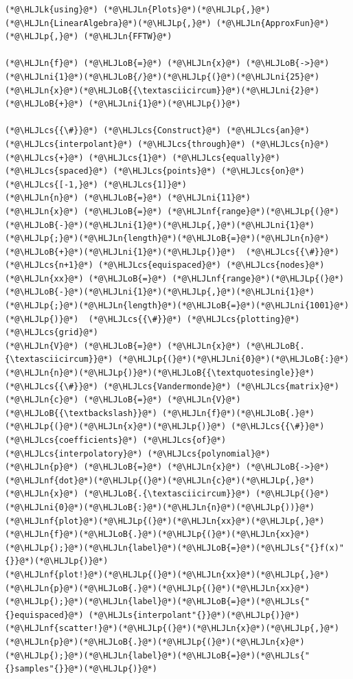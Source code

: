 \documentclass[12pt,a4paper]{article}
\newcommand{\HLJLk}[1]{\textcolor[RGB]{148,91,176}{\textbf{#1}}}
\newcommand{\HLJLn}[1]{#1}
\newcommand{\HLJLnf}[1]{\textcolor[RGB]{66,102,213}{#1}}
\newcommand{\HLJLs}[1]{\textcolor[RGB]{201,61,57}{#1}}
\newcommand{\HLJLni}[1]{\textcolor[RGB]{59,151,46}{#1}}
\newcommand{\HLJLoB}[1]{\textcolor[RGB]{102,102,102}{\textbf{#1}}}
\newcommand{\HLJLp}[1]{#1}
\newcommand{\HLJLcs}[1]{\textcolor[RGB]{153,153,119}{\textit{#1}}}
\begin{document}
\begin{lstlisting}
(*@\HLJLk{using}@*) (*@\HLJLn{Plots}@*)(*@\HLJLp{,}@*) (*@\HLJLn{LinearAlgebra}@*)(*@\HLJLp{,}@*) (*@\HLJLn{ApproxFun}@*)(*@\HLJLp{,}@*) (*@\HLJLn{FFTW}@*)

(*@\HLJLn{f}@*) (*@\HLJLoB{=}@*) (*@\HLJLn{x}@*) (*@\HLJLoB{->}@*) (*@\HLJLni{1}@*)(*@\HLJLoB{/}@*)(*@\HLJLp{(}@*)(*@\HLJLni{25}@*)(*@\HLJLn{x}@*)(*@\HLJLoB{{\textasciicircum}}@*)(*@\HLJLni{2}@*) (*@\HLJLoB{+}@*) (*@\HLJLni{1}@*)(*@\HLJLp{)}@*)

(*@\HLJLcs{{\#}}@*) (*@\HLJLcs{Construct}@*) (*@\HLJLcs{an}@*) (*@\HLJLcs{interpolant}@*) (*@\HLJLcs{through}@*) (*@\HLJLcs{n}@*) (*@\HLJLcs{+}@*) (*@\HLJLcs{1}@*) (*@\HLJLcs{equally}@*) (*@\HLJLcs{spaced}@*) (*@\HLJLcs{points}@*) (*@\HLJLcs{on}@*) (*@\HLJLcs{[-1,}@*) (*@\HLJLcs{1]}@*)
(*@\HLJLn{n}@*) (*@\HLJLoB{=}@*) (*@\HLJLni{11}@*)
(*@\HLJLn{x}@*) (*@\HLJLoB{=}@*) (*@\HLJLnf{range}@*)(*@\HLJLp{(}@*)(*@\HLJLoB{-}@*)(*@\HLJLni{1}@*)(*@\HLJLp{,}@*)(*@\HLJLni{1}@*)(*@\HLJLp{;}@*)(*@\HLJLn{length}@*)(*@\HLJLoB{=}@*)(*@\HLJLn{n}@*)(*@\HLJLoB{+}@*)(*@\HLJLni{1}@*)(*@\HLJLp{)}@*)  (*@\HLJLcs{{\#}}@*) (*@\HLJLcs{n+1}@*) (*@\HLJLcs{equispaced}@*) (*@\HLJLcs{nodes}@*)  
(*@\HLJLn{xx}@*) (*@\HLJLoB{=}@*) (*@\HLJLnf{range}@*)(*@\HLJLp{(}@*)(*@\HLJLoB{-}@*)(*@\HLJLni{1}@*)(*@\HLJLp{,}@*)(*@\HLJLni{1}@*)(*@\HLJLp{;}@*)(*@\HLJLn{length}@*)(*@\HLJLoB{=}@*)(*@\HLJLni{1001}@*)(*@\HLJLp{)}@*)  (*@\HLJLcs{{\#}}@*) (*@\HLJLcs{plotting}@*) (*@\HLJLcs{grid}@*)
(*@\HLJLn{V}@*) (*@\HLJLoB{=}@*) (*@\HLJLn{x}@*) (*@\HLJLoB{.{\textasciicircum}}@*) (*@\HLJLp{(}@*)(*@\HLJLni{0}@*)(*@\HLJLoB{:}@*)(*@\HLJLn{n}@*)(*@\HLJLp{)}@*)(*@\HLJLoB{{\textquotesingle}}@*) (*@\HLJLcs{{\#}}@*) (*@\HLJLcs{Vandermonde}@*) (*@\HLJLcs{matrix}@*)
(*@\HLJLn{c}@*) (*@\HLJLoB{=}@*) (*@\HLJLn{V}@*) (*@\HLJLoB{{\textbackslash}}@*) (*@\HLJLn{f}@*)(*@\HLJLoB{.}@*)(*@\HLJLp{(}@*)(*@\HLJLn{x}@*)(*@\HLJLp{)}@*) (*@\HLJLcs{{\#}}@*) (*@\HLJLcs{coefficients}@*) (*@\HLJLcs{of}@*) (*@\HLJLcs{interpolatory}@*) (*@\HLJLcs{polynomial}@*)
(*@\HLJLn{p}@*) (*@\HLJLoB{=}@*) (*@\HLJLn{x}@*) (*@\HLJLoB{->}@*) (*@\HLJLnf{dot}@*)(*@\HLJLp{(}@*)(*@\HLJLn{c}@*)(*@\HLJLp{,}@*) (*@\HLJLn{x}@*) (*@\HLJLoB{.{\textasciicircum}}@*) (*@\HLJLp{(}@*)(*@\HLJLni{0}@*)(*@\HLJLoB{:}@*)(*@\HLJLn{n}@*)(*@\HLJLp{))}@*)
(*@\HLJLnf{plot}@*)(*@\HLJLp{(}@*)(*@\HLJLn{xx}@*)(*@\HLJLp{,}@*)(*@\HLJLn{f}@*)(*@\HLJLoB{.}@*)(*@\HLJLp{(}@*)(*@\HLJLn{xx}@*)(*@\HLJLp{);}@*)(*@\HLJLn{label}@*)(*@\HLJLoB{=}@*)(*@\HLJLs{"{}f(x)"{}}@*)(*@\HLJLp{)}@*)
(*@\HLJLnf{plot!}@*)(*@\HLJLp{(}@*)(*@\HLJLn{xx}@*)(*@\HLJLp{,}@*)(*@\HLJLn{p}@*)(*@\HLJLoB{.}@*)(*@\HLJLp{(}@*)(*@\HLJLn{xx}@*)(*@\HLJLp{);}@*)(*@\HLJLn{label}@*)(*@\HLJLoB{=}@*)(*@\HLJLs{"{}equispaced}@*) (*@\HLJLs{interpolant"{}}@*)(*@\HLJLp{)}@*)
(*@\HLJLnf{scatter!}@*)(*@\HLJLp{(}@*)(*@\HLJLn{x}@*)(*@\HLJLp{,}@*)(*@\HLJLn{p}@*)(*@\HLJLoB{.}@*)(*@\HLJLp{(}@*)(*@\HLJLn{x}@*)(*@\HLJLp{);}@*)(*@\HLJLn{label}@*)(*@\HLJLoB{=}@*)(*@\HLJLs{"{}samples"{}}@*)(*@\HLJLp{)}@*)
\end{lstlisting}
\end{document}
